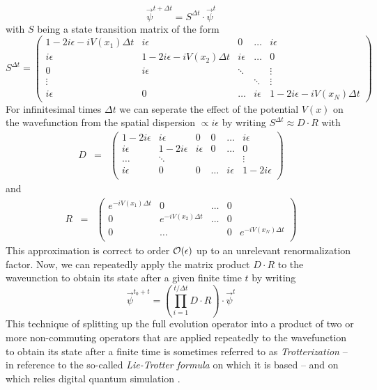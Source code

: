%
\begin{equation}
\vec{\psi}^{t+\Delta t} = S^{\Delta t}  \cdot \vec{\psi}^t
\end{equation}
%
with $S$ being a state transition matrix of the form
%
\begin{equation}
S^{\Delta t} = \left(
	\begin{array}{ccccc}
		1-2i\epsilon-iV(x_1)\Delta t & i\epsilon & 0 & \hdots &  i\epsilon \\
		i \epsilon & 1-2i\epsilon -iV(x_2)\Delta t & i\epsilon & \hdots & 0 \\
		0 & i\epsilon & \ddots & & \vdots \\
		\vdots & & & \ddots  & \vdots \\
		i \epsilon & 0 & \hdots & i\epsilon & 1 - 2i\epsilon -iV(x_N)\Delta t
	\end{array}
 \right) \label{eq:grover_iteration_matrix}
\end{equation}
%
For infinitesimal times $\Delta t$ we can seperate the effect of the potential $V(x)$ on the wavefunction from the spatial dispersion $\propto i\epsilon$ by writing $S^{\Delta t} \approx D\cdot R$ with 
%
\begin{eqnarray}
D & = & \left( 
		\begin{array}{cccccc}
		1-2i \epsilon & i\epsilon & 0 & 0 & \hdots & i\epsilon \\
		i \epsilon & 1 - 2i \epsilon & i \epsilon & 0 & \hdots & 0 \\
		\hdots & \ddots & & & & \vdots \\
		i \epsilon & 0 & 0 &  \hdots & i\epsilon & 1-2i \epsilon \\
		\end{array}
	\right)
\end{eqnarray}
%
and 
%
\begin{eqnarray}
R & = & \left( \begin{array}{ccccc}
	e^{-i V(x_1) \Delta t} & 0 & \hdots & 0 \\
	0 & e^{-i V (x_2) \Delta t} & \hdots & 0 \\
	0 & \hdots & & 0 & e^{-i V (x_N) \Delta t} \\
	\end{array}
	\right)
\end{eqnarray}
%
This approximation is correct to order $\begin{mathcal}O\end{mathcal}(\epsilon)$ up to an unrelevant renormalization factor. Now, we can repeatedly apply the matrix product $D\cdot R$ to the waveunction to obtain its state after a given finite time $t$ by writing
%
\begin{equation}
\vec{\psi}^{t_0+t} = \left(\prod\limits_{i = 1}^{t/\Delta t} D\cdot R\right)\cdot \vec{\psi}^{t} \label{eq:trotter_evolution}
\end{equation}
%
This technique of splitting up the full evolution operator into a product of two or more non-commuting operators that are applied repeatedly to the wavefunction to obtain its state after a finite time is sometimes referred to as {\it Trotterization} -- in reference to the so-called {\it Lie-Trotter formula} on which it is based -- and on which relies digital quantum simulation \citep{lloyd_universal_1996,lanyon_universal_2011}.

